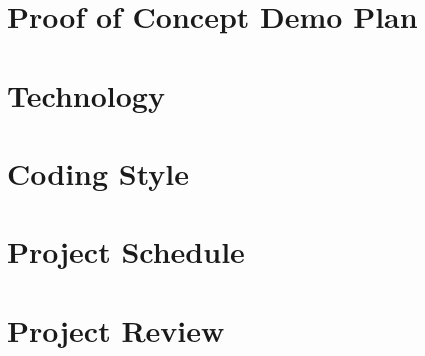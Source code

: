 \documentclass[12pt, titlepage]{article}
\begin{document}
\section{Proof of Concept Demo Plan}

\section{Technology}

\section{Coding Style}

\section{Project Schedule}

\section{Project Review}
\end{document}
